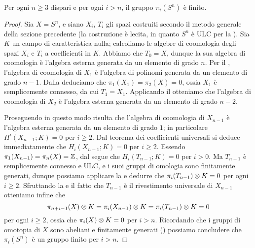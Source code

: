 \begin{theorem}
Per ogni \(n\ge 3\) dispari e per ogni \(i>n\), il gruppo \(\pi_i(S^n)\) è finito.
\end{theorem}
\begin{proof}
Sia \(X=S^n\), e siano \(X_i\), \(T_i\) gli spazi costruiti secondo il metodo generale della sezione precedente (la costruzione è lecita, in quanto \(S^n\) è ULC per la ). Sia \(K\) un campo di caratteristica nulla; calcoliamo le algebre di coomologia degli spazi \(X_i\) e \(T_i\) a coefficienti in \(K\). Abbiamo che \(T_0=X\), dunque la sua algebra di coomologia è l'algebra esterna generata da un elemento di grado \(n\). Per il , l'algebra di coomologia di \(X_1\) è l'algebra di polinomi generata da un elemento di grado \(n-1\). Dalla  deduciamo che \(\pi_1(X_1)=\pi_2(X)=0\), ossia \(X_1\) è semplicemente connesso, da cui \(T_1=X_1\). Applicando il  otteniamo che l'algebra di coomologia di \(X_2\) è l'algebra esterna generata da un elemento di grado \(n-2\).

Proseguendo in questo modo risulta che l'algebra di coomologia di \(X_{n-1}\) è l'algebra esterna generata da un elemento di grado \(1\); in particolare \(H^i(X_{n-1};K)=0\) per \(i\ge 2\). Dal teorema dei coefficienti universali si deduce immediatamente che \(H_i(X_{n-1};K)=0\) per \(i\ge 2\). Essendo \(\pi_1(X_{n-1})=\pi_n(X)=\mathbb{Z}\), dal  segue che \(H_i(T_{n-1};K)=0\) per \(i>0\). Ma \(T_{n-1}\) è semplicemente connesso e ULC, e i suoi gruppi di omologia sono finitamente generati, dunque possiamo applicare la  e dedurre che \(\pi_i(T_{n-1})\mathbin{\otimes} K=0\) per ogni \(i\ge 2\). Sfruttando la  e il fatto che \(T_{n-1}\) è il rivestimento universale di \(X_{n-1}\) otteniamo infine che 
\[
\pi_{n+i-1}(X)\mathbin{\otimes} K=\pi_i(X_{n-1})\mathbin{\otimes} K=\pi_i(T_{n-1})\mathbin{\otimes} K=0
\]
per ogni \(i\ge 2\), ossia che \(\pi_i(X)\mathbin{\otimes} K=0\) per \(i>n\). Ricordando che i gruppi di omotopia di \(X\) sono abeliani e finitamente generati () possiamo concludere che \(\pi_i(S^n)\) è un gruppo finito per \(i>n\).
\end{proof}